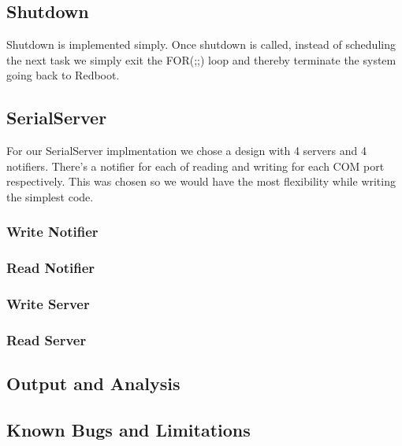 \documentclass{article}
\begin{document}
\subsection{Shutdown}

Shutdown is implemented simply. Once shutdown is called, instead of scheduling the next task we simply exit the FOR(;;) loop and thereby terminate the system going back to Redboot.

\subsection{SerialServer}

For our SerialServer implmentation we chose a design with 4 servers and 4 notifiers. There's a notifier for each of reading and writing for each COM port respectively. This was chosen so we would have the most flexibility while writing the simplest code.

\subsubsection{Write Notifier}


\subsubsection{Read Notifier}


\subsubsection{Write Server}


\subsubsection{Read Server}


\subsection{Output and Analysis}

\subsection{Known Bugs and Limitations}
\begin{itemize}
\end{itemize}
\end{document}
